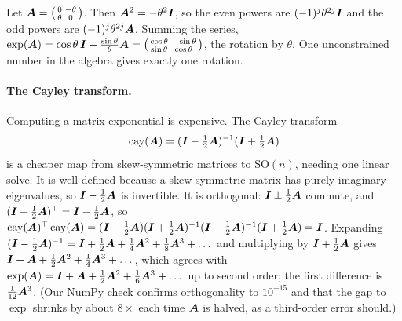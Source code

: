 \begin{example}\label{ex:c11-rotation}
Let $\bm{A} = \begin{psmallmatrix}0 & -\theta\\ \theta & 0\end{psmallmatrix}$. Then
$\bm{A}^2 = -\theta^2\bm{I}$, so the even powers are $(-1)^j\theta^{2j}\bm{I}$ and the odd powers are
$(-1)^j\theta^{2j}\bm{A}$. Summing the series,
$\exp(\bm{A}) = \cos\theta\,\bm{I} + \tfrac{\sin\theta}{\theta}\bm{A}
= \begin{psmallmatrix}\cos\theta & -\sin\theta\\ \sin\theta & \cos\theta\end{psmallmatrix}$, the
rotation by $\theta$. One unconstrained number in the algebra gives exactly one rotation.
\end{example}

\paragraph{The Cayley transform.} Computing a matrix exponential is expensive. The Cayley
transform
\begin{equation}
  \operatorname{cay}(\bm{A}) = (\bm{I} - \tfrac12\bm{A})^{-1}(\bm{I} + \tfrac12\bm{A})
  \label{eq:c11-cayley}
\end{equation}
is a cheaper map from skew-symmetric matrices to $\mathrm{SO}(n)$, needing one linear solve. It is
well defined because a skew-symmetric matrix has purely imaginary eigenvalues, so
$\bm{I} - \tfrac12\bm{A}$ is invertible. It is orthogonal: $\bm{I} \pm \tfrac12\bm{A}$ commute, and
$(\bm{I} + \tfrac12\bm{A})^{\top} = \bm{I} - \tfrac12\bm{A}$, so
$\operatorname{cay}(\bm{A})^{\top}\operatorname{cay}(\bm{A}) = (\bm{I} - \tfrac12\bm{A})(\bm{I} + \tfrac12\bm{A})^{-1}
(\bm{I} - \tfrac12\bm{A})^{-1}(\bm{I} + \tfrac12\bm{A}) = \bm{I}$. Expanding
$(\bm{I} - \tfrac12\bm{A})^{-1} = \bm{I} + \tfrac12\bm{A} + \tfrac14\bm{A}^2 + \tfrac18\bm{A}^3 + \dots$ and multiplying
by $\bm{I} + \tfrac12\bm{A}$ gives $\bm{I} + \bm{A} + \tfrac12\bm{A}^2 + \tfrac14\bm{A}^3 + \dots$, which agrees with
$\exp(\bm{A}) = \bm{I} + \bm{A} + \tfrac12\bm{A}^2 + \tfrac16\bm{A}^3 + \dots$ up to second order; the first
difference is $\tfrac{1}{12}\bm{A}^3$. (Our NumPy check confirms orthogonality to $10^{-15}$ and that
the gap to $\exp$ shrinks by about $8\times$ each time $\bm{A}$ is halved, as a third-order error
should.)

